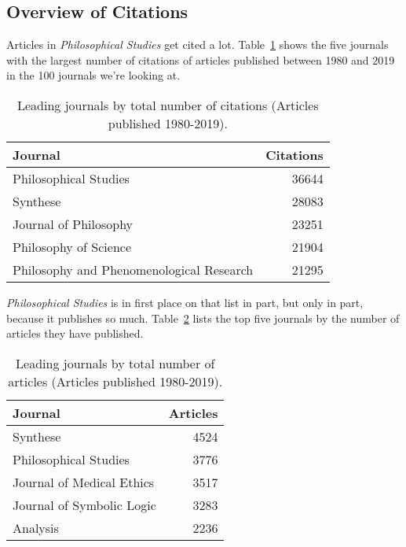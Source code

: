 \documentclass[
  11pt,
  letterpaper,
  DIV=11,
  numbers=noendperiod,
  twoside]{scrartcl}
\begin{document}
\subsection{Overview of Citations}\label{sec-citations-overview}

Articles in \emph{Philosophical Studies} get cited a lot.
Table~\ref{tbl-all-cites} shows the five journals with the largest
number of citations of articles published between 1980 and 2019 in the
100 journals we're looking at.

\begin{longtable}[]{@{}lr@{}}

\caption{\label{tbl-all-cites}Leading journals by total number of
citations (Articles published 1980-2019).}

\tabularnewline

\toprule\noalign{}
Journal & Citations \\
\midrule\noalign{}
\endhead
\bottomrule\noalign{}
\endlastfoot
Philosophical Studies & 36644 \\
Synthese & 28083 \\
Journal of Philosophy & 23251 \\
Philosophy of Science & 21904 \\
Philosophy and Phenomenological Research & 21295 \\

\end{longtable}

\emph{Philosophical Studies} is in first place on that list in part, but
only in part, because it publishes so much. Table~\ref{tbl-all-articles}
lists the top five journals by the number of articles they have
published.

\begin{longtable}[]{@{}lr@{}}

\caption{\label{tbl-all-articles}Leading journals by total number of
articles (Articles published 1980-2019).}

\tabularnewline

\toprule\noalign{}
Journal & Articles \\
\midrule\noalign{}
\endhead
\bottomrule\noalign{}
\endlastfoot
Synthese & 4524 \\
Philosophical Studies & 3776 \\
Journal of Medical Ethics & 3517 \\
Journal of Symbolic Logic & 3283 \\
Analysis & 2236 \\

\end{longtable}
\end{document}
